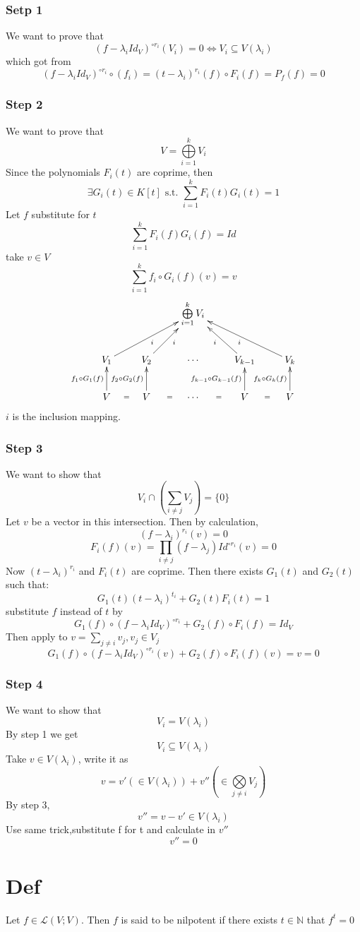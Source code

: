 \documentclass{book}
\begin{document}
\subsubsection{Setp 1}
We want to prove that $$(f-\lambda_i Id_V)^{\circ r_i}(V_i)=0\Leftrightarrow V_i\subseteq V(\lambda_i)$$
which got from 
$$(f-\lambda_i Id_V)^{\circ r_i}\circ(f_i)=(t-\lambda_i)^{r_i}(f)\circ F_i(f)=P_f(f)=0$$
\subsubsection{Step 2}
We want to prove that $$V=\bigoplus\limits_{i=1}^kV_i$$
Since the polynomials $F_i(t)$ are coprime, then
$$\exists G_i(t)\in K[t]\text{ s.t. }\sum\limits_{i=1}^k F_i(t)G_i(t)=1$$
Let $f$ substitute for $t$
$$\sum\limits_{i=1}^k F_i(f)G_i(f)=Id$$
take $v\in V$
$$\sum\limits_{i=1}^k f_i\circ G_i(f)(v)=v$$
$$\xymatrix{
    &&&\bigoplus\limits_{i=1}^kV_i&&\\
    &V_1\ar[urr]_i&V_2\ar[ur]_i&\cdots&V_{k-1}\ar[ul]^i&V_k\ar[ull]^i\\
    &V\ar@{}[r]|=\ar[u]^{f_1\circ G_1(f)}&V\ar[u]^{f_2\circ G_2(f)}\ar@{}[r]|=&\cdots\ar@{}[r]|=&V\ar@{}[r]|=\ar[u]^{f_{k-1}\circ G_{k-1}(f)}&V\ar[u]^{f_k\circ G_k(f)}
}$$
$i$ is the inclusion mapping.
\subsubsection{Step 3}
We want to show that $$V_i\cap (\sum\limits_{i\neq j}V_j)=\{0\}$$
Let $v$ be a vector in this intersection. Then by calculation,
$$(f-\lambda_i)^{r_i}(v)=0$$
$$F_i(f)(v)=\prod\limits_{i\neq j}(f-\lambda_j)Id^{\circ r_i}(v)=0$$
Now $(t-\lambda_i)^{r_i}$ and $F_i(t)$ are coprime. Then there exists $G_1(t)$ and $G_2(t)$  such that:
$$G_1(t)(t-\lambda_i)^{t_i} +G_2(t)F_i(t)=1$$
substitute $f$ instead of $t$ by 
$$G_1(f)\circ (f-\lambda_i Id_V)^{\circ r_i}+G_2(f)\circ F_i(f)=Id_V$$
Then apply to $v=\sum\limits_{j\neq i}v_j,v_j\in V_j$
$$G_1(f)\circ (f-\lambda_i Id_V)^{\circ r_i}(v) +G_2(f)\circ F_i(f)(v)=v=0$$
\subsubsection{Step 4}
We want to show that $$V_i=V(\lambda_i)$$
By step 1 we get $$V_i\subseteq V(\lambda_i)$$Take $v\in V(\lambda_i)$, write it as $$v=v'(\in V(\lambda_i))+v''(\in \bigotimes\limits_{j\neq i}V_j)$$
By step 3, $$v''=v-v'\in V(\lambda_i)$$
Use same trick,substitute f for t and calculate in $v''$
$$v''=0$$
\section{Def}
Let $f\in  \mathscr{L}(V;V)$. Then $f$ is said to be nilpotent if there exists $t\in \mathbb{N}$ that $f^t=0$
\end{document}
